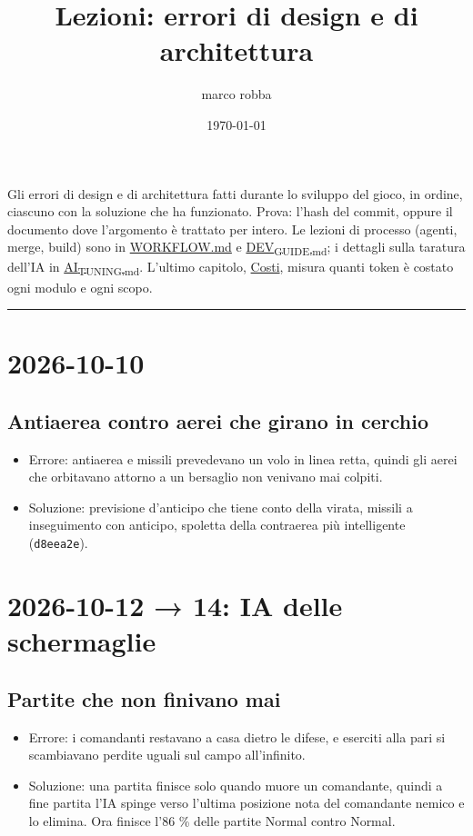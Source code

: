 \documentclass[11pt]{article}
\author{marco robba}
\date{\today}
\title{Lezioni: errori di design e di architettura}
\begin{document}
\maketitle
\tableofcontents

Gli errori di design e di architettura fatti durante lo sviluppo del gioco, in ordine, ciascuno con la soluzione che
ha funzionato. Prova: l'hash del commit, oppure il documento dove l'argomento è trattato per intero. Le lezioni di
processo (agenti, merge, build) sono in \href{WORKFLOW.md}{WORKFLOW.md} e \href{DEV\_GUIDE.md}{DEV\textsubscript{GUIDE.md}}; i dettagli sulla
taratura dell'IA in \href{AI\_TUNING.md}{AI\textsubscript{TUNING.md}}. L'ultimo capitolo, \hyperref[sec:org0c05727]{Costi}, misura quanti token è costato ogni modulo
e ogni scopo.

\noindent\rule{\textwidth}{0.5pt}
\section{2026-10-10}
\label{sec:org8b5fb2f}

\subsection{Antiaerea contro aerei che girano in cerchio}
\label{sec:org988693b}
\begin{itemize}
\item Errore: antiaerea e missili prevedevano un volo in linea retta, quindi gli aerei che orbitavano attorno a un
bersaglio non venivano mai colpiti.
\item Soluzione: previsione d'anticipo che tiene conto della virata, missili a inseguimento con anticipo, spoletta della
contraerea più intelligente (\texttt{d8eea2e}).
\end{itemize}
\section{2026-10-12 → 14: IA delle schermaglie}
\label{sec:org0d22547}

\subsection{Partite che non finivano mai}
\label{sec:org96e69a5}
\begin{itemize}
\item Errore: i comandanti restavano a casa dietro le difese, e eserciti alla pari si scambiavano perdite uguali sul
campo all'infinito.
\item Soluzione: una partita finisce solo quando muore un comandante, quindi a fine partita l'IA spinge verso l'ultima
posizione nota del comandante nemico e lo elimina. Ora finisce l'86 \% delle partite Normal contro Normal.
\end{itemize}
\end{document}
